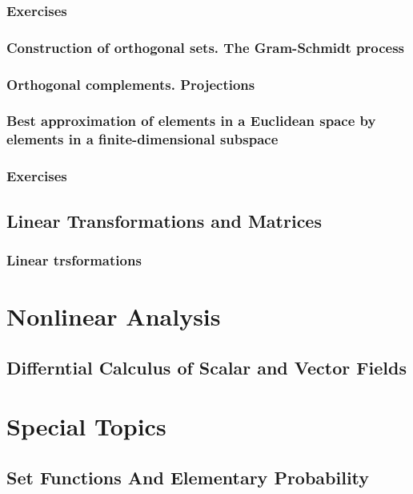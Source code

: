 \documentclass[cn,11pt,chinese]{elegantbook}
\numberwithin{equation}{section}
\begin{document}
\section{Exercises}


\section{Construction of orthogonal sets. The Gram-Schmidt process}


\section{Orthogonal complements. Projections}


\section{Best approximation of elements in a Euclidean space by elements in a finite-dimensional subspace}


\section{Exercises}


\chapter{Linear Transformations and Matrices}
\section{Linear trsformations}




\part{Nonlinear Analysis}
\chapter{Differntial Calculus of Scalar and Vector Fields}





\part{Special Topics}
\chapter{Set Functions And Elementary Probability}







% 

\appendix
\end{document}
